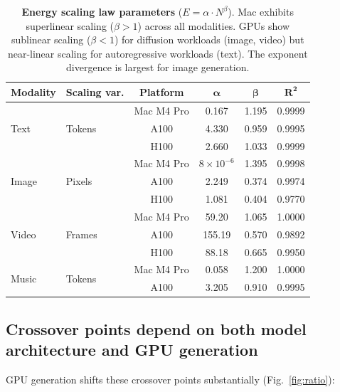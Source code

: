\documentclass[preprint,12pt]{elsarticle}
\begin{document}
\begin{table}[t]
\centering
\caption{\textbf{Energy scaling law parameters} ($E = \alpha \cdot N^\beta$). Mac exhibits superlinear scaling ($\beta > 1$) across all modalities. GPUs show sublinear scaling ($\beta < 1$) for diffusion workloads (image, video) but near-linear scaling for autoregressive workloads (text). The exponent divergence is largest for image generation.}
\label{tab:scaling}
\small
\begin{tabular}{@{}llcccc@{}}
\toprule
\textbf{Modality} & \textbf{Scaling var.} & \textbf{Platform} & $\boldsymbol{\alpha}$ & $\boldsymbol{\beta}$ & $\boldsymbol{R^2}$ \\
\midrule
\multirow{3}{*}{Text} & \multirow{3}{*}{Tokens} & Mac M4 Pro & 0.167 & 1.195 & 0.9999 \\
 & & A100 & 4.330 & 0.959 & 0.9995 \\
 & & H100 & 2.660 & 1.033 & 0.9999 \\
\midrule
\multirow{3}{*}{Image} & \multirow{3}{*}{Pixels} & Mac M4 Pro & $8 \times 10^{-6}$ & 1.395 & 0.9998 \\
 & & A100 & 2.249 & 0.374 & 0.9974 \\
 & & H100 & 1.081 & 0.404 & 0.9770 \\
\midrule
\multirow{3}{*}{Video} & \multirow{3}{*}{Frames} & Mac M4 Pro & 59.20 & 1.065 & 1.0000 \\
 & & A100 & 155.19 & 0.570 & 0.9892 \\
 & & H100 & 88.18 & 0.665 & 0.9950 \\
\midrule
\multirow{2}{*}{Music} & \multirow{2}{*}{Tokens} & Mac M4 Pro & 0.058 & 1.200 & 1.0000 \\
 & & A100 & 3.205 & 0.910 & 0.9995 \\
\bottomrule
\end{tabular}
\end{table}

\subsection{Crossover points depend on both model architecture and GPU generation}

GPU generation shifts these crossover points substantially (Fig.~\ref{fig:ratio}):
\end{document}
